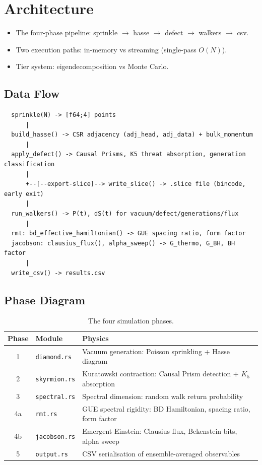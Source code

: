 \documentclass[11pt, a4paper, openany]{book}
\newcommand{\code}[1]{\texttt{#1}}
\newenvironment{introduction}[1][Chapter Overview]{%
  \begin{tcolorbox}[
    enhanced,colback=structure!5,colframe=structure,
    colbacktitle=structure,coltitle=white,
    fonttitle=\small\bfseries,title={#1},
    arc=2pt,boxrule=0.7pt,
    left=8pt,right=8pt,top=6pt,bottom=6pt,
    before skip=12pt,after skip=12pt
  ]\itshape\begin{itemize}[leftmargin=*,itemsep=2pt,parsep=0pt]
}{%
  \end{itemize}\end{tcolorbox}
}
\begin{document}
\chapter{Architecture}

\begin{introduction}
  \item The four-phase pipeline: sprinkle $\to$ hasse $\to$ defect $\to$ walkers $\to$ csv.
  \item Two execution paths: in-memory vs streaming (single-pass $O(N)$).
  \item Tier system: eigendecomposition vs Monte Carlo.
\end{introduction}

\section{Data Flow}

\begin{verbatim}
  sprinkle(N) -> [f64;4] points
      |
  build_hasse() -> CSR adjacency (adj_head, adj_data) + bulk_momentum
      |
  apply_defect() -> Causal Prisms, K5 threat absorption, generation classification
      |
      +--[--export-slice]--> write_slice() -> .slice file (bincode, early exit)
      |
  run_walkers() -> P(t), dS(t) for vacuum/defect/generations/flux
      |
  rmt: bd_effective_hamiltonian() -> GUE spacing ratio, form factor
  jacobson: clausius_flux(), alpha_sweep() -> G_thermo, G_BH, BH factor
      |
  write_csv() -> results.csv
\end{verbatim}

\section{Phase Diagram}

\begin{table}[H]
\centering
\begin{tabular}{@{} c l l @{}}
\toprule
\textbf{Phase} & \textbf{Module} & \textbf{Physics} \\
\midrule
1 & \code{diamond.rs}  & Vacuum generation: Poisson sprinkling + Hasse diagram \\
2 & \code{skyrmion.rs} & Kuratowski contraction: Causal Prism detection + $K_5$ absorption \\
3 & \code{spectral.rs} & Spectral dimension: random walk return probability \\
4a & \code{rmt.rs}      & GUE spectral rigidity: BD Hamiltonian, spacing ratio, form factor \\
4b & \code{jacobson.rs} & Emergent Einstein: Clausius flux, Bekenstein bits, alpha sweep \\
5 & \code{output.rs}   & CSV serialisation of ensemble-averaged observables \\
\bottomrule
\end{tabular}
\caption{The four simulation phases.}
\end{table}
\end{document}
